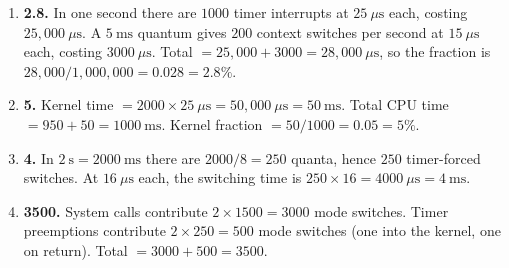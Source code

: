 \documentclass[11pt]{article}
\begin{document}
\begin{enumerate}
\item[\textbf{Q7}] \textbf{2.8.} In one second there are $1000$ timer interrupts at $25\ \mu\text{s}$ each, costing $25{,}000\ \mu\text{s}$. A $5\ \text{ms}$ quantum gives $200$ context switches per second at $15\ \mu\text{s}$ each, costing $3000\ \mu\text{s}$. Total $= 25{,}000 + 3000 = 28{,}000\ \mu\text{s}$, so the fraction is $28{,}000/1{,}000{,}000 = 0.028 = 2.8\%$.

\item[\textbf{Q8}] \textbf{5.} Kernel time $= 2000 \times 25\ \mu\text{s} = 50{,}000\ \mu\text{s} = 50\ \text{ms}$. Total CPU time $= 950 + 50 = 1000\ \text{ms}$. Kernel fraction $= 50/1000 = 0.05 = 5\%$.

\item[\textbf{Q9}] \textbf{4.} In $2\ \text{s} = 2000\ \text{ms}$ there are $2000/8 = 250$ quanta, hence $250$ timer-forced switches. At $16\ \mu\text{s}$ each, the switching time is $250 \times 16 = 4000\ \mu\text{s} = 4\ \text{ms}$.

\item[\textbf{Q10}] \textbf{3500.} System calls contribute $2 \times 1500 = 3000$ mode switches. Timer preemptions contribute $2 \times 250 = 500$ mode switches (one into the kernel, one on return). Total $= 3000 + 500 = 3500$.

\end{enumerate}
\end{document}
